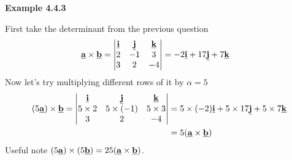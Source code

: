 \textbf{Example 4.4.3} \par

First take the determinant from the previous question
\begin{align*}
\underline{\mathbf{a}}\times\underline{\mathbf{b}} = \begin{vmatrix}
    \underline{\mathbf{i}} & \underline{\mathbf{j}} & \underline{\mathbf{k}}\\
    2 & -1 & 3\\
    3 & 2 & -4
\end{vmatrix} &= -2\underline{\mathbf{i}} + 17\underline{\mathbf{j}} + 7\underline{\mathbf{k}}
\end{align*}
Now let's try multiplying different rows of it by $\alpha = 5$
\begin{align*}
(5\underline{\mathbf{a}})\times\underline{\mathbf{b}} = \begin{vmatrix}
    \underline{\mathbf{i}} & \underline{\mathbf{j}} & \underline{\mathbf{k}}\\
    5\times2 & 5\times(-1) & 5\times3\\
    3 & 2 & -4
\end{vmatrix} &= 5\times(-2)\underline{\mathbf{i}} + 5\times17\underline{\mathbf{j}} + 5\times7\underline{\mathbf{k}} \\
&= 5 (\underline{\mathbf{a}}\times\underline{\mathbf{b}}) 
\end{align*}
Useful note $(5\underline{\mathbf{a}})\times (5\underline{\mathbf{b}}) = 25(\underline{\mathbf{a}}\times\underline{\mathbf{b}})$.